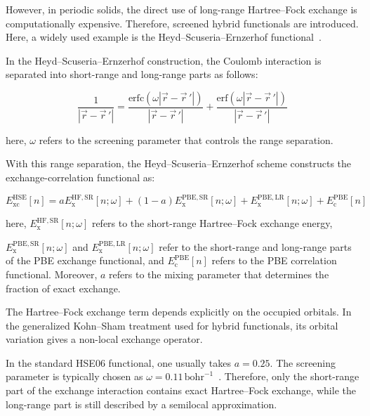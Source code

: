 However, in periodic solids,
the direct use of long-range Hartree--Fock exchange is computationally expensive.
Therefore, screened hybrid functionals are introduced.
Here, a widely used example is the Heyd--Scuseria--Ernzerhof functional~\cite{heyd2003hybrid}.

In the Heyd--Scuseria--Ernzerhof construction,
the Coulomb interaction is separated into short-range and long-range parts as follows:

\begin{equation}
    \frac{1}{|\vec{r}-\vec{r}\,'|}
    = \frac{\mathrm{erfc}\left(\omega |\vec{r}-\vec{r}\,'|\right)}{|\vec{r}-\vec{r}\,'|}
    + \frac{\mathrm{erf}\left(\omega |\vec{r}-\vec{r}\,'|\right)}{|\vec{r}-\vec{r}\,'|}
\label{HSE_range_separation_of_Coulomb_interaction}
\end{equation}

here, $\omega$ refers to the screening parameter that controls the range separation.

With this range separation, the Heyd--Scuseria--Ernzerhof scheme constructs the exchange-correlation functional as:

\begin{equation}
    E_\mathrm{xc}^\mathrm{HSE}[n]
    = aE_\mathrm{x}^{\mathrm{HF},\mathrm{SR}}[n;\omega]
    + (1-a)E_\mathrm{x}^{\mathrm{PBE},\mathrm{SR}}[n;\omega]
    + E_\mathrm{x}^{\mathrm{PBE},\mathrm{LR}}[n;\omega]
    + E_\mathrm{c}^\mathrm{PBE}[n]
\label{HSE_exchange_correlation_functional}
\end{equation}

here, $E_\mathrm{x}^{\mathrm{HF},\mathrm{SR}}[n;\omega]$ refers to the short-range Hartree--Fock exchange energy,

$E_\mathrm{x}^{\mathrm{PBE},\mathrm{SR}}[n;\omega]$ and $E_\mathrm{x}^{\mathrm{PBE},\mathrm{LR}}[n;\omega]$ refer to the short-range and long-range parts of the PBE exchange functional,
and $E_\mathrm{c}^\mathrm{PBE}[n]$ refers to the PBE correlation functional.
Moreover, $a$ refers to the mixing parameter that determines the fraction of exact exchange.

The Hartree--Fock exchange term depends explicitly on the occupied orbitals.
In the generalized Kohn--Sham treatment used for hybrid functionals,
its orbital variation gives a non-local exchange operator.

In the standard HSE06 functional,
one usually takes $a=0.25$.
The screening parameter is typically chosen as $\omega=0.11\,\mathrm{bohr}^{-1}$~\cite{krukau2006influence}.
Therefore, only the short-range part of the exchange interaction contains exact Hartree--Fock exchange,
while the long-range part is still described by a semilocal approximation.

